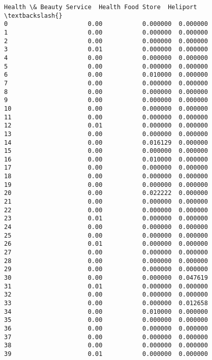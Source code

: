 \documentclass[11pt]{article}
\begin{document}
\begin{tcolorbox}[breakable, size=fbox, boxrule=.5pt, pad at break*=1mm, opacityfill=0]
\begin{Verbatim}[commandchars=\\\{\}]
    Health \& Beauty Service  Health Food Store  Heliport  \textbackslash{}
0                      0.00           0.000000  0.000000
1                      0.00           0.000000  0.000000
2                      0.00           0.000000  0.000000
3                      0.01           0.000000  0.000000
4                      0.00           0.000000  0.000000
5                      0.00           0.000000  0.000000
6                      0.00           0.010000  0.000000
7                      0.00           0.000000  0.000000
8                      0.00           0.000000  0.000000
9                      0.00           0.000000  0.000000
10                     0.00           0.000000  0.000000
11                     0.00           0.000000  0.000000
12                     0.01           0.000000  0.000000
13                     0.00           0.000000  0.000000
14                     0.00           0.016129  0.000000
15                     0.00           0.000000  0.000000
16                     0.00           0.010000  0.000000
17                     0.00           0.000000  0.000000
18                     0.00           0.000000  0.000000
19                     0.00           0.000000  0.000000
20                     0.00           0.022222  0.000000
21                     0.00           0.000000  0.000000
22                     0.00           0.000000  0.000000
23                     0.01           0.000000  0.000000
24                     0.00           0.000000  0.000000
25                     0.00           0.000000  0.000000
26                     0.01           0.000000  0.000000
27                     0.00           0.000000  0.000000
28                     0.00           0.000000  0.000000
29                     0.00           0.000000  0.000000
30                     0.00           0.000000  0.047619
31                     0.01           0.000000  0.000000
32                     0.00           0.000000  0.000000
33                     0.00           0.000000  0.012658
34                     0.00           0.010000  0.000000
35                     0.00           0.000000  0.000000
36                     0.00           0.000000  0.000000
37                     0.00           0.000000  0.000000
38                     0.00           0.000000  0.000000
39                     0.01           0.000000  0.000000


\end{Verbatim}
\end{tcolorbox}
\end{document}
